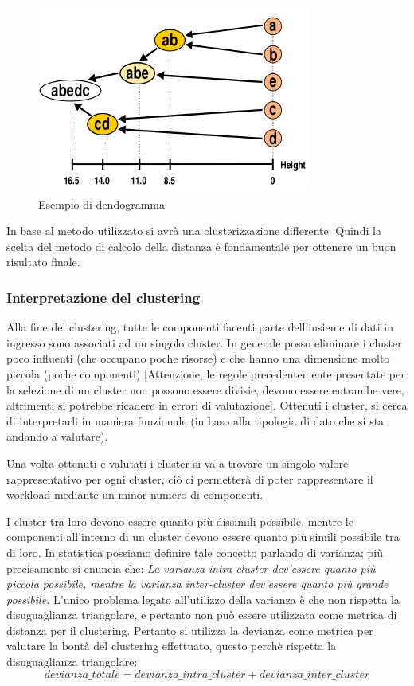 \begin{figure}[h]
\centering
\includegraphics[width=.8\textwidth]{img/chapter-3/dendogramma.png}
\caption{Esempio di dendogramma}\label{img:dendogramma}
\end{figure}

\begin{warn}
In base al metodo utilizzato si avrà una clusterizzazione differente. Quindi la scelta del metodo di calcolo della distanza è fondamentale per ottenere un buon risultato finale.
\end{warn}

\subsubsection{Interpretazione del clustering}
Alla fine del clustering, tutte le componenti facenti parte dell'insieme di dati in ingresso sono associati ad un singolo cluster. In generale posso eliminare i cluster poco influenti (che occupano poche risorse) e che hanno una dimensione molto piccola (poche componenti) [Attenzione, le regole precedentemente presentate per la selezione di un cluster non possono essere divisie, devono essere entrambe vere, altrimenti si potrebbe ricadere in errori di valutazione]. Ottenuti i cluster, si cerca di interpretarli in maniera funzionale (in baso alla tipologia di dato che si sta andando a valutare).

Una volta ottenuti e valutati i cluster si va a trovare un singolo valore rappresentativo per ogni cluster, ciò ci permetterà di poter rappresentare il workload mediante un minor numero di componenti.

I cluster tra loro devono essere quanto più dissimili possibile, mentre le componenti all'interno di un cluster devono essere quanto più simili possibile tra di loro. In statistica possiamo definire tale concetto parlando di varianza; più precisamente si enuncia che:
\textit{La varianza intra-cluster dev'essere quanto più piccola possibile, mentre la varianza inter-cluster dev'essere quanto più grande possibile.}
L'unico problema legato all'utilizzo della varianza è che non rispetta la disuguaglianza triangolare, e pertanto non può essere utilizzata come metrica di distanza per il clustering. Pertanto si utilizza la devianza come metrica per valutare la bontà del clustering effettuato, questo perchè rispetta la disuguaglianza triangolare:
\[
devianza\_totale = devianza\_intra\_cluster + devianza\_inter\_cluster
\label{for:triangolare}
\]

